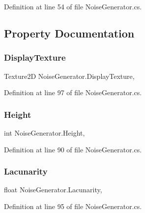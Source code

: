 Definition at line 54 of file Noise\+Generator.\+cs.



\subsection{Property Documentation}
\mbox{\label{class_noise_generator_aacc3af2790c43181aef02a21686c0a0f}} 
\subsubsection{Display\+Texture}
{\footnotesize\ttfamily Texture2D Noise\+Generator.\+Display\+Texture\hspace{0.3cm}{\ttfamily [get]}, {\ttfamily [set]}}



Definition at line 97 of file Noise\+Generator.\+cs.

\mbox{\label{class_noise_generator_afcc9298c8a526298e1c831503d011ef6}} 
\subsubsection{Height}
{\footnotesize\ttfamily int Noise\+Generator.\+Height\hspace{0.3cm}{\ttfamily [get]}, {\ttfamily [set]}}



Definition at line 90 of file Noise\+Generator.\+cs.

\mbox{\label{class_noise_generator_ab19c364d60bddc1d663b7dd86edc1034}} 
\subsubsection{Lacunarity}
{\footnotesize\ttfamily float Noise\+Generator.\+Lacunarity\hspace{0.3cm}{\ttfamily [get]}, {\ttfamily [set]}}



Definition at line 95 of file Noise\+Generator.\+cs.

\mbox{\label{class_noise_generator_ac7f30e6f8f78c71a4c96b3a244c1dc32}} 
